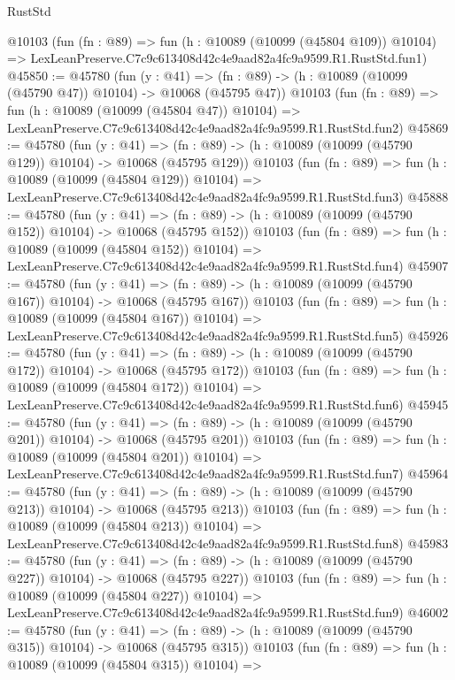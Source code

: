 \begin{lexlean}{RustStd}
\begin{coremodule}
    @10103
    (fun (fn : @89) =>
    fun (h : @10089 (@10099 (@45804 @109)) @10104) =>
    LexLeanPreserve.C7c9c613408d42c4e9aad82a4fc9a9599.R1.RustStd.fun1)
@45850 := @45780
    (fun (y : @41) =>
    (fn : @89) -> (h : @10089 (@10099 (@45790 @47)) @10104) -> @10068 (@45795 @47))
    @10103
    (fun (fn : @89) =>
    fun (h : @10089 (@10099 (@45804 @47)) @10104) =>
    LexLeanPreserve.C7c9c613408d42c4e9aad82a4fc9a9599.R1.RustStd.fun2)
@45869 := @45780
    (fun (y : @41) =>
    (fn : @89) -> (h : @10089 (@10099 (@45790 @129)) @10104) -> @10068 (@45795 @129))
    @10103
    (fun (fn : @89) =>
    fun (h : @10089 (@10099 (@45804 @129)) @10104) =>
    LexLeanPreserve.C7c9c613408d42c4e9aad82a4fc9a9599.R1.RustStd.fun3)
@45888 := @45780
    (fun (y : @41) =>
    (fn : @89) -> (h : @10089 (@10099 (@45790 @152)) @10104) -> @10068 (@45795 @152))
    @10103
    (fun (fn : @89) =>
    fun (h : @10089 (@10099 (@45804 @152)) @10104) =>
    LexLeanPreserve.C7c9c613408d42c4e9aad82a4fc9a9599.R1.RustStd.fun4)
@45907 := @45780
    (fun (y : @41) =>
    (fn : @89) -> (h : @10089 (@10099 (@45790 @167)) @10104) -> @10068 (@45795 @167))
    @10103
    (fun (fn : @89) =>
    fun (h : @10089 (@10099 (@45804 @167)) @10104) =>
    LexLeanPreserve.C7c9c613408d42c4e9aad82a4fc9a9599.R1.RustStd.fun5)
@45926 := @45780
    (fun (y : @41) =>
    (fn : @89) -> (h : @10089 (@10099 (@45790 @172)) @10104) -> @10068 (@45795 @172))
    @10103
    (fun (fn : @89) =>
    fun (h : @10089 (@10099 (@45804 @172)) @10104) =>
    LexLeanPreserve.C7c9c613408d42c4e9aad82a4fc9a9599.R1.RustStd.fun6)
@45945 := @45780
    (fun (y : @41) =>
    (fn : @89) -> (h : @10089 (@10099 (@45790 @201)) @10104) -> @10068 (@45795 @201))
    @10103
    (fun (fn : @89) =>
    fun (h : @10089 (@10099 (@45804 @201)) @10104) =>
    LexLeanPreserve.C7c9c613408d42c4e9aad82a4fc9a9599.R1.RustStd.fun7)
@45964 := @45780
    (fun (y : @41) =>
    (fn : @89) -> (h : @10089 (@10099 (@45790 @213)) @10104) -> @10068 (@45795 @213))
    @10103
    (fun (fn : @89) =>
    fun (h : @10089 (@10099 (@45804 @213)) @10104) =>
    LexLeanPreserve.C7c9c613408d42c4e9aad82a4fc9a9599.R1.RustStd.fun8)
@45983 := @45780
    (fun (y : @41) =>
    (fn : @89) -> (h : @10089 (@10099 (@45790 @227)) @10104) -> @10068 (@45795 @227))
    @10103
    (fun (fn : @89) =>
    fun (h : @10089 (@10099 (@45804 @227)) @10104) =>
    LexLeanPreserve.C7c9c613408d42c4e9aad82a4fc9a9599.R1.RustStd.fun9)
@46002 := @45780
    (fun (y : @41) =>
    (fn : @89) -> (h : @10089 (@10099 (@45790 @315)) @10104) -> @10068 (@45795 @315))
    @10103
    (fun (fn : @89) =>
    fun (h : @10089 (@10099 (@45804 @315)) @10104) =>

\end{coremodule}
\end{lexlean}
